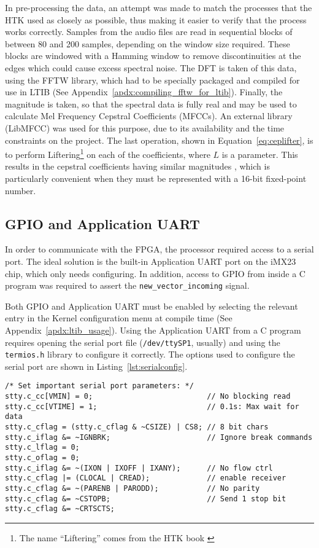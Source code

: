 		In pre-processing the data, an attempt was made to match the processes that the HTK used as closely as possible, thus making it easier to verify that the process works correctly.  Samples from the audio files are read in sequential blocks of between 80 and 200 samples, depending on the window size required.  These blocks are windowed with a Hamming window to remove discontinuities at the edges which could cause excess spectral noise.  The DFT is taken of this data, using the FFTW library, which had to be specially packaged and compiled for use in LTIB (See Appendix~\ref{apdx:compiling_fftw_for_ltib}).  Finally, the magnitude is taken, so that the spectral data is fully real and may be used to calculate Mel Frequency Cepstral Coefficients (MFCCs).  An external library (LibMFCC) was used for this purpose, due to its availability and the time constraints on the project.  The last operation, shown in Equation~\ref{eq:ceplifter}, is to perform Liftering\footnote{The name ``Liftering'' comes from the HTK book \cite{htkbook}} on each of the coefficients, where $L$ is a parameter.  This results in the cepstral coefficients having similar magnitudes \cite{htkbook}, which is particularly convenient when they must be represented with a 16-bit fixed-point number.

	\subsection{GPIO and Application UART} %
	\label{sub:gpio_application_uart}
		In order to communicate with the FPGA, the processor required access to a serial port.  The ideal solution is the built-in Application UART port on the iMX23 chip, which only needs configuring.  In addition, access to GPIO from inside a C program was required to assert the \texttt{new\_vector\_incoming} signal.

		Both GPIO and Application UART must be enabled by selecting the relevant entry in the Kernel configuration menu at compile time (See Appendix~\ref{apdx:ltib_usage}).  Using the Application UART from a C program requires opening the serial port file (\texttt{/dev/ttySP1}, usually) and using the \texttt{termios.h} library to configure it correctly.  The options used to configure the serial port are shown in Listing~\ref{lst:serialconfig}.

\begin{lstlisting}[style=customc, label=lst:serialconfig, caption=Serial Port Configuration]
/* Set important serial port parameters: */
stty.c_cc[VMIN] = 0;                          // No blocking read
stty.c_cc[VTIME] = 1;                         // 0.1s: Max wait for data
stty.c_cflag = (stty.c_cflag & ~CSIZE) | CS8; // 8 bit chars
stty.c_iflag &= ~IGNBRK;                      // Ignore break commands
stty.c_lflag = 0;
stty.c_oflag = 0;
stty.c_iflag &= ~(IXON | IXOFF | IXANY);      // No flow ctrl
stty.c_cflag |= (CLOCAL | CREAD);             // enable receiver
stty.c_cflag &= ~(PARENB | PARODD);           // No parity
stty.c_cflag &= ~CSTOPB;                      // Send 1 stop bit
stty.c_cflag &= ~CRTSCTS;
\end{lstlisting}

